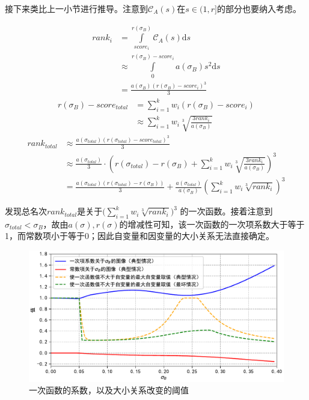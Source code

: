             接下来类比上一小节进行推导。注意到$\mathcal{C}_A(s)$在$s\in (1,r]$的部分也要纳入考虑。

            \begin{align*}
                \textit{rank}_i
                &=\int\limits_{\textit{score}_i}^{r(\sigma_B)} \mathcal{C}_A(s) \mathrm{d}s \\
                &\approx\int\limits_0^{r(\sigma_B)-\textit{score}_i} a(\sigma_B) s^2 \mathrm{d}s \\
                &=\frac{a(\sigma_B)\left(r(\sigma_B)-\textit{score}_i\right)^3}3
            \end{align*}
            \begin{align*}
                r(\sigma_B)-\textit{score}_{\textit{total}}
                &=\sum\limits_{i=1}^k w_i\left(r(\sigma_B)-\textit{score}_i\right) \\
                &\approx\sum\limits_{i=1}^k w_i\sqrt[3]{\frac{3\textit{rank}_i}{a(\sigma_B)}}
            \end{align*}
            \begin{align*}
                \textit{rank}_{\textit{total}}
                &\approx\frac{a(\sigma_{\textit{total}})(r(\sigma_{\textit{total}})-\textit{score}_{\textit{total}})^3}3 \\
                &\approx\frac{a(\sigma_{\textit{total}})}{3}\cdot\left(r(\sigma_{\textit{total}})-r(\sigma_B)+\sum\limits_{i=1}^k w_i\sqrt[3]{\frac{3\textit{rank}_i}{a(\sigma_B)}}\right)^3 \\
                &=\frac{a(\sigma_{\textit{total}})\left(r(\sigma_{\textit{total}})-r(\sigma_B)\right)}{3}+\frac{a(\sigma_{\textit{total}})}{a(\sigma_B)}\left(\sum\limits_{i=1}^k w_i\sqrt[3]{\textit{rank}_i}\right)^3
            \end{align*}

            发现总名次$\textit{rank}_{\textit{total}}$是关于$\big(\sum_{i=1}^k w_i\sqrt[3]{\textit{rank}_i}\big)^3$ 的一次函数。接着注意到$\sigma_{\textit{total}}<\sigma_B$，故由$a(\sigma),r(\sigma)$的增减性可知，该一次函数的一次项系数大于等于1，而常数项小于等于0；因此自变量和因变量的大小关系无法直接确定。

            \begin{figure}[htbp]
                \centering
                \includegraphics[width=\textwidth]{fig/plottingKandB.pdf}
                \caption{一次函数的系数，以及大小关系改变的阈值}
                \label{fig:plottingKandB}
            \end{figure}

